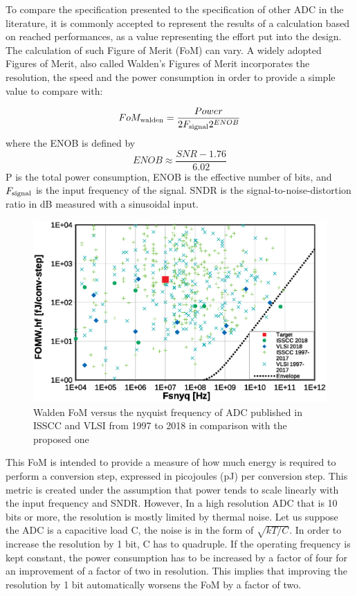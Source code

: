 To compare the specification presented to the specification of other ADC in the literature, it is commonly accepted to represent the results of a calculation based on reached performances, as a value representing the effort put into the design. The calculation of such Figure of Merit (FoM) can vary. A widely adopted Figures of Merit, also called Walden’s Figures of Merit incorporates the resolution, the speed and the power consumption in order to provide a simple value to compare with:

\begin{equation}
FoM_{\rm walden} = \frac{Power}{2 F_{\rm signal} 2^{ENOB}}
\end{equation}
where the ENOB is defined by 
\begin{equation}
ENOB \approx \frac{SNR -1.76}{6.02}
\end{equation}
P is the total power consumption, ENOB is the effective number of bits, and \(F_{\rm signal}\) is the input frequency of the signal. SNDR is the signal-to-noise-distortion ratio in dB measured with a sinusoidal input. 

\begin{figure}[htp]
    \centering
    \includegraphics[width=.8\textwidth]{Chapter2/Figs/Vector/walden-fom-2018.eps}
    \caption{Walden FoM versus the nyquist frequency of ADC published in ISSCC and VLSI from 1997 to 2018 in comparison with the proposed one}
    \label{fig:walden-fom-comparison}
\end{figure}

This FoM is intended to provide a measure of how much energy is required to perform a conversion step, expressed in picojoules (pJ) per conversion step. This metric is created under the assumption that power tends to scale linearly with the input frequency and SNDR. However, In a high resolution ADC that is 10 bits or more, the resolution is mostly limited by thermal noise. Let us suppose the ADC is a capacitive load C, the noise is in the form of \(\sqrt{kT/C}\). In order to increase the resolution by 1 bit, C has to quadruple. If the operating frequency is kept constant, the power consumption has to be increased by a factor of four for an improvement of a factor of two in resolution. This implies that improving the resolution by 1 bit automatically worsens the FoM by a factor of two.

